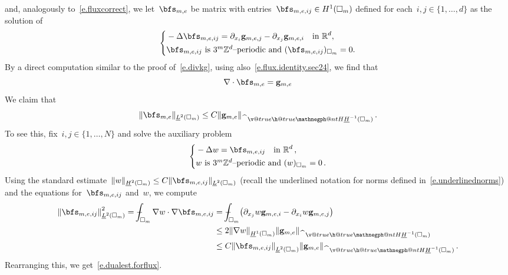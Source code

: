 \documentclass[11pt,twoside]{article} %
\makeatletter
\let\oldsquare\square %
\renewcommand{\square}{\oldsquare}
\numberwithin{equation}{section}
\theoremstyle{definition}
\let\originalleft\left
\let\originalright\right
\renewcommand{\left}{\mathopen{}\mathclose\bgroup\originalleft}
\renewcommand{\right}{\aftergroup\egroup\originalright}
\newcommand*{\Z}{\ensuremath{\mathbb{Z}}}
\newcommand*{\R}{\ensuremath{\mathbb{R}}}
\renewcommand*{\hat}{\widehat}
\newcommand{\g}{\mathbf{g}}
\newcommand{\cu}{\square}
\def\Xint#1{\mathchoice
{\XXint\displaystyle\textstyle{#1}}%
{\XXint\textstyle\scriptstyle{#1}}%
{\XXint\scriptstyle\scriptscriptstyle{#1}}%
{\XXint\scriptscriptstyle\scriptscriptstyle{#1}}%
\!\int}
\def\XXint#1#2#3{{\setbox0=\hbox{$#1{#2#3}{\int}$}
\vcenter{\hbox{$#2#3$}}\kern-.5\wd0}}
\def\fint{\Xint-}
\newcommand{\negphantom}{\v@true\h@true\negph@nt}
\newcommand{\negph@nt}{\ifmmode\expandafter\mathpalette 
  \expandafter\mathnegph@nt\else\expandafter\makenegph@nt\fi}
\newcommand{\makenegph@nt}[1]{%
  \setbox\z@\hbox{\color@begingroup#1\color@endgroup}\finnegph@nt}
\newcommand{\finnegph@nt}{%
  \setbox\tw@\null 
  \ifv@ \ht\tw@\ht\z@\dp\tw@\dp\z@\fi \ifh@\wd\tw@-\wd\z@\fi\box\tw@}
\newcommand{\mathnegph@nt}[2]{%
  \setbox\z@\hbox{$\m@th #1{#2}$}\finnegph@nt}
\newcommand{\Hminusul}{\hat{\phantom{H}}\negphantom{H}\underline{H}^{-1}}
\makeatother
\begin{document}
and, analogously to~\eqref{e.fluxcorrect}, we let~$\bfs_{m,e}$ be matrix with entries~$\bfs_{m,e,ij} \in H^1(\cu_m)$ defined for each~$i,j\in\{1,\ldots,d\}$ as the solution of  
\begin{equation}
\label{e.fluxcorrect.sec24}
\left\{
\begin{aligned}
&
-\Delta \bfs_{m,e,ij} = \partial_{x_i} \g_{m,e,j} - \partial_{x_j} \g_{m,e,i} 
\quad \mbox{in}  \ \R^d, \\
& \bfs_{m,e,ij}  \ \mbox{is~$3^m\Z^d$--periodic and} \ ( \bfs_{m,e,ij} )_{\cu_m} = 0.
\end{aligned}
\right. 
\end{equation}
By a direct computation similar to the proof of~\eqref{e.divkg}, using also~\eqref{e.flux.identity.sec24}, we find that  
\begin{equation}
\label{e.fluxcorrect.FV.divg}
\nabla \cdot \bfs_{m,e} = \g_{m,e}
\end{equation}
We claim that 
\begin{equation}
\label{e.dualest.forflux}
\| \bfs_{m,e} \|_{\underline{L}^2(\cu_m)} 
\leq
C\| \g_{m,e} \|_{\Hminusul(\cu_m)} \,.
\end{equation}
To see this, fix~$i,j\in\{1,\ldots,N\}$ and solve the auxiliary problem 
\begin{equation*}
\left\{
\begin{aligned}
&
-\Delta w = \bfs_{m,e,ij} 
\quad \mbox{in}  \ \R^d \,,
\\
& w  \ \mbox{is~$3^m\Z^d$--periodic and} \ ( w )_{\cu_m} = 0
\,.
\end{aligned}
\right. 
\end{equation*}
Using the standard estimate~$\| w \|_{\underline{H}^2(\cu_m)} \leq C \| \bfs_{m,e,ij} \|_{\underline{L}^2(\cu_m)}$ (recall the underlined notation for norms defined in~\eqref{e.underlinednorms}) and the equations for~$\bfs_{m,e,ij}$ and~$w$, we compute
\begin{align*}
\left\| \bfs_{m,e,ij} \right\|_{\underline{L}^2(\cu_m)}^2 
=
\fint_{\cu_m} \nabla w \cdot \nabla \bfs_{m,e,ij} 
& 
= 
\fint_{\cu_m} \bigl( 
\partial_{x_j} w \g_{m,e,i} - \partial_{x_i} w \g_{m,e,j} \bigr)
\\ & 
\leq 
2 \left\| \nabla w \right\|_{\underline{H}^1(\cu_m)} \left\| \g_{m,e} \right\|_{\Hminusul(\cu_m)}
\\ &
\leq 
C \left\| \bfs_{m,e,ij} \right\|_{\underline{L}^2(\cu_m)} \left\| \g_{m,e} \right\|_{\Hminusul(\cu_m)}\,.
\end{align*}
Rearranging this, we get~\eqref{e.dualest.forflux}. 
\end{document}
